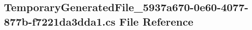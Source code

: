 \hypertarget{_temporary_generated_file__5937a670-0e60-4077-877b-f7221da3dda1_8cs}{\subsection{Temporary\-Generated\-File\-\_\-5937a670-\/0e60-\/4077-\/877b-\/f7221da3dda1.cs File Reference}
\label{_temporary_generated_file__5937a670-0e60-4077-877b-f7221da3dda1_8cs}
}
